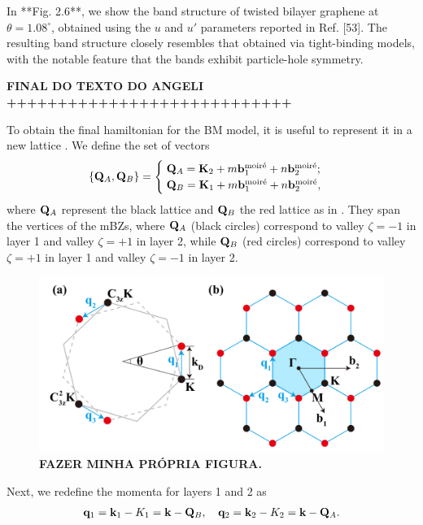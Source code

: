 In **Fig. 2.6**, we show the band structure of twisted bilayer graphene at \( \theta = 1.08^\circ \), obtained using the \( u \) and \( u' \) parameters reported in Ref. [53]. The resulting band structure closely resembles that obtained via tight-binding models, with the notable feature that the bands exhibit particle-hole symmetry.

\textbf{FINAL DO TEXTO DO ANGELI ++++++++++++++++++++++++++++}

To obtain the final hamiltonian for the BM model, it is useful to represent it in a new lattice \cite{all_magic_angles}. We define the set of vectors
\begin{equation} \label{eq:Q_lattice_QA_QB_def}
\{{\vb{Q}}_A, {\vb{Q}}_B\} =
\begin{cases}
\; {\vb{Q}}_A = {\vb{K}}_2 + m {\vb{b}}_1^{\text{moiré}} + n {\vb{b}}_2^{\text{moiré}}; \\
\; {\vb{Q}}_B = {\vb{K}}_1 + m {\vb{b}}_1^{\text{moiré}} + n {\vb{b}}_2^{\text{moiré}},
\end{cases}
\end{equation}
where ${\vb{Q}}_A$ represent the black lattice and ${\vb{Q}}_B$ the red lattice as in \cite{thesis_angeli, all_magic_angles}. They span the vertices of the mBZs, where ${\vb{Q}}_A$ (black circles) correspond to valley $\zeta = -1$ in layer 1 and valley $\zeta = +1$ in layer 2, while ${\vb{Q}}_B$ (red circles) correspond to valley $\zeta = +1$ in layer 1 and valley $\zeta = -1$ in layer 2.

\begin{figure}[H]
\centering
\includegraphics[width=0.8\linewidth]{fig/moire-vectors.png}
\caption{\textbf{FAZER MINHA PRÓPRIA FIGURA.}}
\end{figure}

Next, we redefine the momenta for layers 1 and 2 as
\begin{equation} \label{eq:redef_k1k2_momenta_Qlattice}
{\vb{q}}_1 = {\vb{k}}_1 - K_1 = {\vb{k}} - {\vb{Q}}_B, \quad {\vb{q}}_2 = {\vb{k}}_2 - K_2 = {\vb{k}} - {\vb{Q}}_A.
\end{equation}

